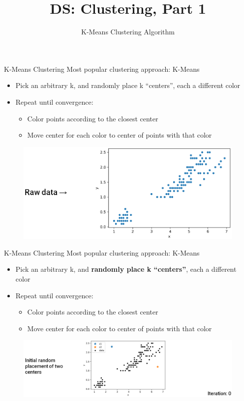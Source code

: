 \documentclass[aspectratio=169]{../latex_main/tntbeamer}  %
\title[Introduction]{DS: Clustering, Part 1}
\subtitle{K-Means Clustering Algorithm}
\begin{document}
	
	\maketitle
	\begin{frame}{K-Means Clustering}
	    Most popular clustering approach: K-Means
	    \begin{itemize}
	        \item Pick an arbitrary k, and randomly place k “centers”, each a different color
	        \item Repeat until convergence:
	        \begin{itemize}
	            \item Color points according to the closest center
	            \item Move center for each color to center of points with that color
	        \end{itemize}
	    \end{itemize}
	    \begin{figure}
	        \centering
	        \includegraphics[scale=.4]{Bild7}
	    \end{figure}
	\end{frame}
	
	
	
	\begin{frame}{K-Means Clustering}
	    Most popular clustering approach: K-Means
	    \begin{itemize}
	        \item Pick an arbitrary k, and \textbf{randomly place k “centers”}, each a different color
	        \item Repeat until convergence:
	        \begin{itemize}
	            \item Color points according to the closest center
	            \item Move center for each color to center of points with that color
	        \end{itemize}
	    \end{itemize}
	    \begin{figure}
	        \centering
	        \includegraphics[scale=.4]{Bild8}
	    \end{figure}
	\end{frame}
	
\end{document}
